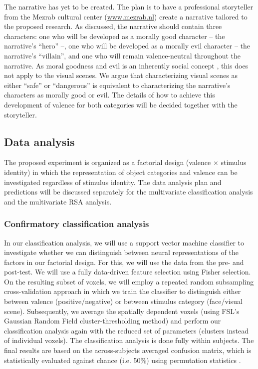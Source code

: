 \documentclass[12pt,a4paper]{article}\usepackage[]{graphicx}\usepackage[]{color}
\begin{document}
The narrative has yet to be created. The plan is to have a professional storyteller from the Mezrab cultural center (\url{www.mezrab.nl}) create a narrative tailored to the proposed research. As discussed, the narrative should contain three characters: one who will be developed as a morally good character -- the narrative's ``hero'' --, one who will be developed as a morally evil character -- the narrative's ``villain'', and one who will remain valence-neutral throughout the narrative. As moral goodness and evil is an inherently social concept \citep{greene2002}, this does not apply to the visual scenes. We argue that characterizing visual scenes as either ``safe'' or ``dangerous'' is equivalent to characterizing the narrative's characters as morally good or evil. The details of how to achieve this development of valence for both categories will be decided together with the storyteller. 

\subsection{Data analysis}
The proposed experiment is organized as a factorial design (valence $\times$ stimulus identity) in which the representation of object categories and valence can be investigated regardless of stimulus identity. The data analysis plan and predictions will be discussed separately for the multivariate classification analysis and the multivariate RSA analysis.

\subsubsection{Confirmatory classification analysis}
In our classification analysis, we will use a support vector machine classifier to investigate whether we can distinguish between neural representations of the factors in our factorial design. For this, we will use the data from the pre- and post-test. We will use a fully data-driven feature selection using Fisher selection. On the resulting subset of voxels, we will employ a repeated random subsampling cross-validation approach in which we train the classifier to distinguish either between valence (positive/negative) or between stimulus category (face/visual scene). Subsequently, we average the spatially dependent voxels (using FSL's Gaussian Random Field cluster-thresholding method) and perform our classification analysis again with the reduced set of parameters (clusters instead of individual voxels). The classification analysis is done fully within subjects. The final results are based on the across-subjects averaged confusion matrix, which is statistically evaluated against chance (i.e. 50\%) using permutation statistics \citep{nichols2002}.     
\end{document}

